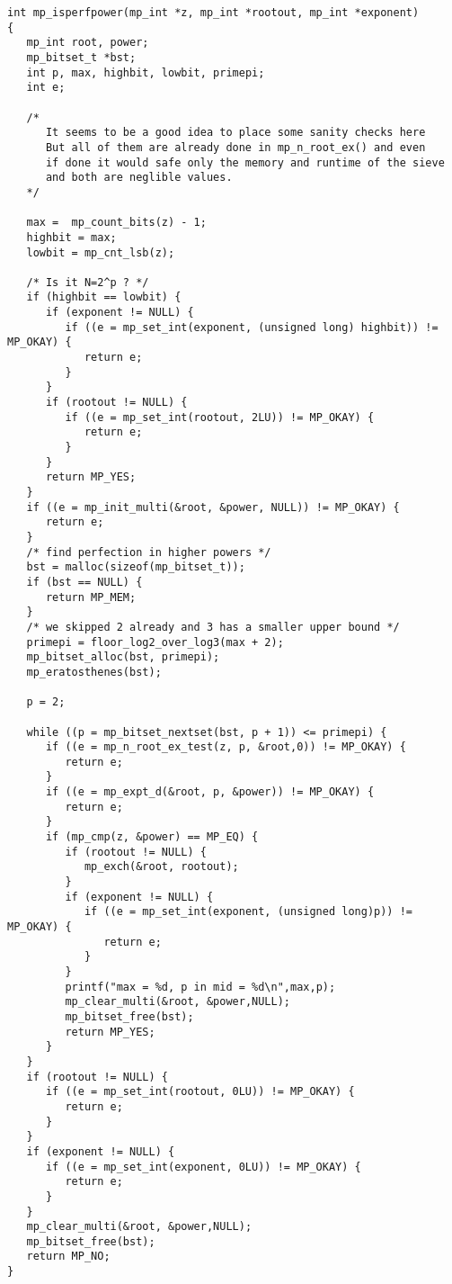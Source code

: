 \documentclass[a4paper,10pt]{report}
\theoremstyle{plain} %
\theoremstyle{definition}
\theoremstyle{remark}
\begin{document}
\begin{lstlisting}
int mp_isperfpower(mp_int *z, mp_int *rootout, mp_int *exponent)
{
   mp_int root, power;
   mp_bitset_t *bst;
   int p, max, highbit, lowbit, primepi;
   int e;

   /* 
      It seems to be a good idea to place some sanity checks here
      But all of them are already done in mp_n_root_ex() and even
      if done it would safe only the memory and runtime of the sieve
      and both are neglible values.
   */

   max =  mp_count_bits(z) - 1;
   highbit = max;
   lowbit = mp_cnt_lsb(z);

   /* Is it N=2^p ? */
   if (highbit == lowbit) {
      if (exponent != NULL) {
         if ((e = mp_set_int(exponent, (unsigned long) highbit)) != MP_OKAY) {
            return e;
         }
      }
      if (rootout != NULL) {
         if ((e = mp_set_int(rootout, 2LU)) != MP_OKAY) {
            return e;
         }
      }
      return MP_YES;
   }
   if ((e = mp_init_multi(&root, &power, NULL)) != MP_OKAY) {
      return e;
   }
   /* find perfection in higher powers */
   bst = malloc(sizeof(mp_bitset_t));
   if (bst == NULL) {
      return MP_MEM;
   }
   /* we skipped 2 already and 3 has a smaller upper bound */
   primepi = floor_log2_over_log3(max + 2);
   mp_bitset_alloc(bst, primepi);
   mp_eratosthenes(bst);

   p = 2;

   while ((p = mp_bitset_nextset(bst, p + 1)) <= primepi) {
      if ((e = mp_n_root_ex_test(z, p, &root,0)) != MP_OKAY) {
         return e;
      }
      if ((e = mp_expt_d(&root, p, &power)) != MP_OKAY) {
         return e;
      }
      if (mp_cmp(z, &power) == MP_EQ) {
         if (rootout != NULL) {
            mp_exch(&root, rootout);
         }
         if (exponent != NULL) {
            if ((e = mp_set_int(exponent, (unsigned long)p)) != MP_OKAY) {
               return e;
            }
         }
         printf("max = %d, p in mid = %d\n",max,p);
         mp_clear_multi(&root, &power,NULL);
         mp_bitset_free(bst);
         return MP_YES;
      }
   }
   if (rootout != NULL) {
      if ((e = mp_set_int(rootout, 0LU)) != MP_OKAY) {
         return e;
      }
   }
   if (exponent != NULL) {
      if ((e = mp_set_int(exponent, 0LU)) != MP_OKAY) {
         return e;
      }
   }
   mp_clear_multi(&root, &power,NULL);
   mp_bitset_free(bst);
   return MP_NO;
}
\end{lstlisting}
\end{document}
